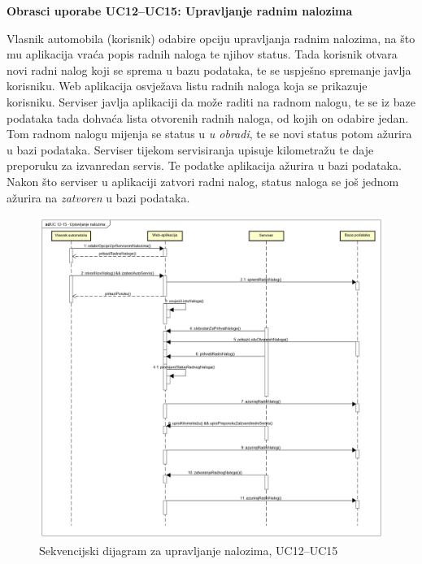 \textbf{Obrasci uporabe UC12--UC15: Upravljanje radnim nalozima}
	
\noindent Vlasnik automobila (korisnik) odabire opciju upravljanja radnim nalozima, na što mu aplikacija vraća popis radnih naloga te njihov status. Tada korisnik otvara novi radni nalog koji se sprema u bazu podataka, te se uspješno spremanje javlja korisniku. Web aplikacija osvježava listu radnih naloga koja se prikazuje korisniku. Serviser javlja aplikaciji da može raditi na radnom nalogu, te se iz baze podataka tada dohvaća lista otvorenih radnih naloga, od kojih on odabire jedan. Tom radnom nalogu mijenja se status u \textit{u obradi}, te se novi status potom ažurira u bazi podataka. Serviser tijekom servisiranja upisuje kilometražu te daje preporuku za izvanredan servis. Te podatke aplikacija ažurira u bazi podataka. Nakon što serviser u aplikaciji zatvori radni nalog, status naloga se još jednom ažurira na \textit{zatvoren} u bazi podataka.
	
	\begin{figure}[H]
		\includegraphics[width=\linewidth]{dijagrami/seq-dia1.png}
		\centering
		\caption{Sekvencijski dijagram za upravljanje nalozima, UC12--UC15}
		\label{fig:sequence-diagram1}
	\end{figure}




   	
\eject

